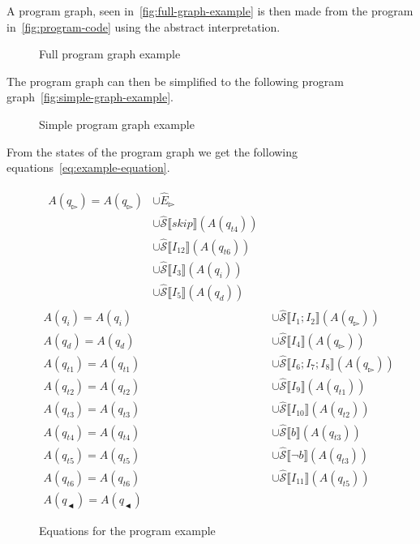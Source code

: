 A program graph, seen in~\autoref{fig:full-graph-example} is then made from the program in~\autoref{fig:program-code} using the abstract interpretation.

\begin{figure}
    \centering
    
    \caption[short]{Full program graph example}
    \label{fig:full-graph-example}
\end{figure}


The program graph can then be simplified to the following program graph~\autoref{fig:simple-graph-example}.

\begin{figure}
    \centering
    
    \caption[short]{Simple program graph example}
    \label{fig:simple-graph-example}
\end{figure}

From the states of the program graph we get the following equations~\autoref{eq:example-equation}.

\begin{figure}
    \centering
    \begin{align}
        \begin{split}
            A(q_\whitepointerright)=A(q_\whitepointerright) &\cup \hat E_\whitepointerright \\&\cup \mathcal{\hat S} \lBrack skip \rBrack(A(q_{t4}))\\&\cup \mathcal{\hat S} \lBrack I_{12} \rBrack (A(q_{t6})) \\&\cup \mathcal{\hat S} \lBrack I_3 \rBrack (A(q_i)) \\&\cup \mathcal{\hat S} \lBrack I_5 \rBrack (A(q_d))
        \end{split}\\
        A(q_i)=A(q_i)&\cup \mathcal{\hat S} \lBrack I_1;I_2 \rBrack (A(q_\whitepointerright ))\\
        A(q_d)=A(q_d)&\cup \mathcal{\hat S} \lBrack I_4 \rBrack (A(q_\whitepointerright ))\\
        A(q_{t1})=A(q_{t1})&\cup \mathcal{\hat S} \lBrack I_6;I_7;I_8 \rBrack (A(q_\whitepointerright))\\
        A(q_{t2})=A(q_{t2})&\cup \mathcal{\hat S} \lBrack I_9 \rBrack (A(q_{t1}))\\
        A(q_{t3})=A(q_{t3})&\cup \mathcal{\hat S} \lBrack I_{10} \rBrack (A(q_{t2}))\\
        A(q_{t4})=A(q_{t4})&\cup \mathcal{\hat S} \lBrack b \rBrack (A(q_{t3}))\\
        A(q_{t5})=A(q_{t5})&\cup \mathcal{\hat S} \lBrack \neg b \rBrack (A(q_{t3}))\\
        A(q_{t6})=A(q_{t6})&\cup \mathcal{\hat S} \lBrack I_{11} \rBrack (A(q_{t5}))\\
        A(q_\blackpointerleft)=A(q_\blackpointerleft)
    \end{align}
    \label{eq:example-equation}
    \caption[short]{Equations for the program example}
\end{figure}
    
